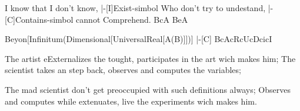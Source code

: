 
I know that I don't know,                            |-[I]Exist-simbol
Who don't try to undestand,                          |-[C]Contains-simbol
cannot Comprehend.                                   BcA
                                                     BeA

Beyon[Infinitum(Dimensional[Universal{Real[A(B)]}])]                         |-[C] 
                                                                          BcAcRcUcDcicI


The artist eExternalizes the tought, participates in the art wich makes him;
The scientist takes an step back, observes and computes the variables;

The mad scientist don't get preoccupied with such definitions always;
Observes and computes while extenuates, live the experiments wich makes him. 



